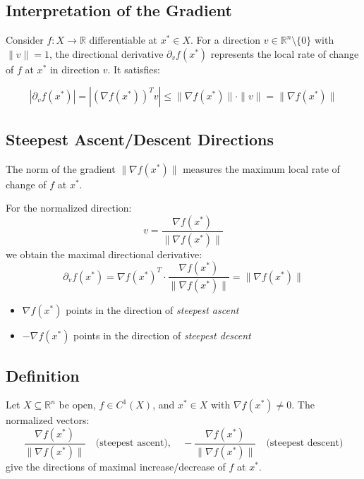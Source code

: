 \documentclass{article}
\begin{document}
\subsection*{Interpretation of the Gradient}
Consider \( f: X \rightarrow \mathbb{R} \) differentiable at \( x^* \in X \). For a direction \( v \in \mathbb{R}^n \setminus \{0\} \) with \( \|v\| = 1 \), the directional derivative \( \partial_v f(x^*) \) represents the local rate of change of \( f \) at \( x^* \) in direction \( v \). It satisfies:

\[
|\partial_v f(x^*)| = |(\nabla f(x^*))^T v| \leq \|\nabla f(x^*)\| \cdot \|v\| = \|\nabla f(x^*)\|
\]

\subsection*{Steepest Ascent/Descent Directions}
The norm of the gradient \( \|\nabla f(x^*)\| \) measures the maximum local rate of change of \( f \) at \( x^* \). 

For the normalized direction:
\[
v = \frac{\nabla f(x^*)}{\|\nabla f(x^*)\|}
\]
we obtain the maximal directional derivative:
\[
\partial_v f(x^*) = \nabla f(x^*)^T \cdot \frac{\nabla f(x^*)}{\|\nabla f(x^*)\|} = \|\nabla f(x^*)\|
\]

\begin{itemize}
    \item \( \nabla f(x^*) \) points in the direction of \textit{steepest ascent}
    \item \( -\nabla f(x^*) \) points in the direction of \textit{steepest descent}
\end{itemize}

\subsection*{Definition}
Let \( X \subseteq \mathbb{R}^n \) be open, \( f \in C^1(X) \), and \( x^* \in X \) with \( \nabla f(x^*) \neq 0 \). The normalized vectors:
\[
\frac{\nabla f(x^*)}{\|\nabla f(x^*)\|} \quad \text{(steepest ascent)}, \quad -\frac{\nabla f(x^*)}{\|\nabla f(x^*)\|} \quad \text{(steepest descent)}
\]
give the directions of maximal increase/decrease of \( f \) at \( x^* \).
\end{document}
